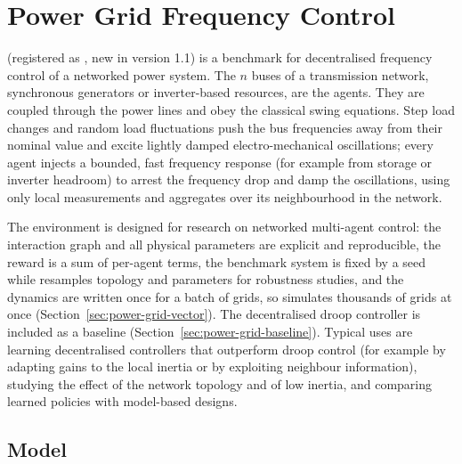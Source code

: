 \begingroup
\setlength{\emergencystretch}{3em}
\chapter{Power Grid Frequency Control}\label{chap:power_grid}

 (registered as ,
new in version 1.1) is a benchmark for decentralised frequency control of a
networked power system. The $n$ buses of a transmission network, synchronous
generators or inverter-based resources, are the agents. They are coupled
through the power lines and obey the classical swing equations. Step load
changes and random load fluctuations push the bus frequencies away from their
nominal value and excite lightly damped electro-mechanical oscillations; every
agent injects a bounded, fast frequency response (for example from storage or
inverter headroom) to arrest the frequency drop and damp the oscillations,
using only local measurements and aggregates over its neighbourhood in the
network.

The environment is designed for research on networked multi-agent control: the
interaction graph and all physical parameters are explicit and reproducible,
the reward is a sum of per-agent terms, the benchmark system is fixed by a seed
while  resamples topology and parameters for
robustness studies, and the dynamics are written once for a batch of grids, so
 simulates thousands of grids at once
(Section~\ref{sec:power-grid-vector}). The decentralised droop controller is
included as a baseline (Section~\ref{sec:power-grid-baseline}). Typical uses are
learning decentralised controllers that outperform droop control (for example
by adapting gains to the local inertia or by exploiting neighbour information),
studying the effect of the network topology and of low inertia, and
comparing learned policies with model-based designs.

\section{Model}\label{sec:power-grid-model}

